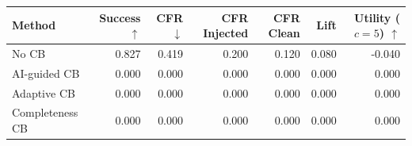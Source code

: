 \begin{tabular}{lrrrrrr}
\toprule
Method & Success $\uparrow$ & CFR $\downarrow$ & CFR Injected & CFR Clean & Lift & Utility ($c=5$) $\uparrow$ \\
\midrule
No CB & 0.827 & 0.419 & 0.200 & 0.120 & 0.080 & -0.040 \\
AI-guided CB & 0.000 & 0.000 & 0.000 & 0.000 & 0.000 & 0.000 \\
Adaptive CB & 0.000 & 0.000 & 0.000 & 0.000 & 0.000 & 0.000 \\
Completeness CB & 0.000 & 0.000 & 0.000 & 0.000 & 0.000 & 0.000 \\
\bottomrule
\end{tabular}
